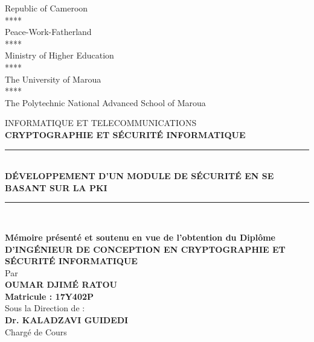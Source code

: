 \documentclass[12pt,a4paper]{report}
\newlength{\drop}
\begin{document}
\begin{minipage}[c]{.35\textwidth}
    \footnotesize
    \begin{center}
    Republic of Cameroon\\
	****\\
	Peace-Work-Fatherland\\
	****\\
	Ministry of Higher Education\\
	****\\
	The University of Maroua\\
	****\\
	The Polytechnic National Advanced School of Maroua\\
    \end{center}
\end{minipage}
\begin{center}
	\textheight %
	\vspace{0.5\drop}
	INFORMATIQUE ET TELECOMMUNICATIONS\\
	\textheight 
	\vspace{0.4\drop}
	\textbf{CRYPTOGRAPHIE ET SÉCURITÉ INFORMATIQUE}
	\rule{.95\textwidth}{2pt}\\
	\large{\textbf{DÉVELOPPEMENT D'UN MODULE DE SÉCURITÉ EN SE BASANT SUR LA PKI}}\\
	\rule{.95\textwidth}{2pt}\\%

\end{center}


\begin{center}
	\textbf{Mémoire présenté et soutenu en vue de l’obtention du Diplôme}\\
	\vspace{0.2cm}
	\textbf{D’INGÉNIEUR DE CONCEPTION EN CRYPTOGRAPHIE ET SÉCURITÉ INFORMATIQUE}\\
	\vspace{0.2cm}
	Par \\
	\vspace{0.2cm}
	\textbf{OUMAR DJIMÉ RATOU}\\
	\vspace{0.2cm}
	\textbf{Matricule : 17Y402P}\\
	\vspace{0.3cm}
	Sous la Direction de : \\
	\vspace{0.2cm}
	\textbf{Dr. KALADZAVI GUIDEDI}\\
	\vspace{0.2cm}
	Chargé de Cours
	
	

\end{center}
\end{document}
